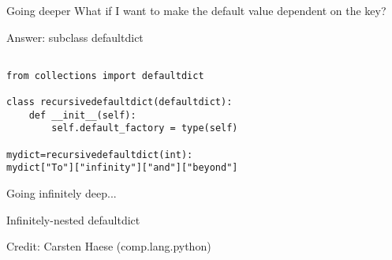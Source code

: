 \documentclass{beamer}
\begin{document}
\begin{frame}{Going deeper}
 What if I want to make the default value dependent on the key?
 
 Answer: subclass defaultdict
 
\vspace{1.5em}
{\usebox{\mysavebox}}
    
\end{frame}

\begin{lrbox}{\mysavebox}
\begin{lstlisting}

from collections import defaultdict

class recursivedefaultdict(defaultdict):
    def __init__(self):
        self.default_factory = type(self)

mydict=recursivedefaultdict(int):
mydict["To"]["infinity"]["and"]["beyond"]

\end{lstlisting}
\end{lrbox}


\begin{frame}{Going infinitely deep...}

Infinitely-nested defaultdict

\usebox{\mysavebox}

\bigskip
Credit: Carsten Haese (comp.lang.python)

\end{frame}
\end{document}
